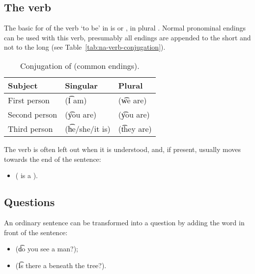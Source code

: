 \subsection{The verb }
The basic for of the verb `to be' in \quenya is  or ,
in plural . Normal pronominal endings can be used with this verb,
presumably all endings are appended to the short  and not to the long
 (see Table~\ref{tab:na-verb-conjugation}).

\begin{table}
\centering
\caption{Conjugation of  (common endings).}
\begin{tabular}{lll}
\toprule
Subject & Singular & Plural \\
\midrule
First person & \q{} (\t{I am}) & \q{} (\t{we are}) \\
Second person & \q{} (\t{you are}) & \q{} (\t{you are}) \\
Third person & \q{} (\t{he/she/it is}) & \q{} (\t{they are}) \\
\bottomrule
\end{tabular}
\end{table}

The verb  is often left out when it is understood, and, if present,
usually moves towards the end of the sentence:
\begin{itemize}
  \item {} (\t{ is a }).
\end{itemize}

\subsection{Questions}
An ordinary sentence can be transformed into a question by adding the word
 in front of the sentence:
\begin{itemize}
  \item {} (\t{do you see a man?});
  \item {} (\t{Is there a  beneath the tree?}).
\end{itemize}

